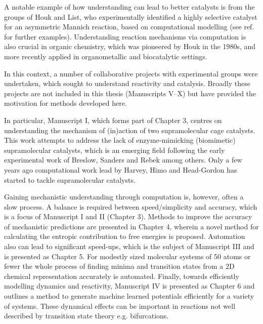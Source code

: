 \documentclass[../main.tex]{subfiles}
\begin{document}
A notable example of how understanding can lead to better catalysts is from the groups of Houk and List, who experimentally identified a highly selective catalyst for an asymmetric Mannich reaction,\cite{Mitsumori2006} based on computational modelling (see ref. \cite{Houk2008} for  further examples).\cite{Cheong2006} Understanding reaction mechanisms via computation is also crucial in organic chemistry, which was pioneered by Houk in the 1980s,\cite{Houk1986} and more recently applied in organometallic\cite{Ardkhean2020} and biocatalytic\cite{PlanasIglesias2021} settings. 

In this context, a number of collaborative projects with experimental groups were undertaken, which sought to understand reactivity and catalysis. Broadly these projects are not included in this thesis (Manuscripts \RN{5}--\RN{10}) but have provided the motivation for methods developed here.

In particular, Manuscript \RN{1}, which forms part of  Chapter 3, centres on understanding the mechanism of (in)action of two supramolecular cage catalysts. This work attempts to address the lack of enzyme-mimicking (biomimetic) supramolecular catalysts, which is an emerging field following the early experimental work of Breslow,\cite{Breslow1998}   Sanders\cite{Sanders1998} and Rebek\cite{Santamaria1999} among others. Only a few years ago computational work lead by Harvey\cite{Daver2017, Daver2018}, Himo\cite{Brea2019} and Head-Gordon\cite{Welborn2020} has started to tackle supramolecular catalysts.

Gaining mechanistic understanding through computation is, however, often a slow process. A balance is required between speed/simplicity and accuracy, which is a focus of Manuscript \RN{1} and \RN{2} (Chapter 3). Methods to improve the accuracy of mechanistic predictions are presented in Chapter 4, wherein a novel method for calculating the entropic contribution to free energies is proposed. Automation also can lead to significant speed-ups, which is the subject of Manuscript \RN{3} and is presented as Chapter 5. For modestly sized molecular systems of 50 atoms or fewer the whole process of finding minima and transition states from a 2D chemical representation accurately is automated. Finally, towards efficiently modelling dynamics and reactivity, Manuscript \RN{4} is presented as Chapter 6 and outlines a method to generate machine learned potentials efficiently for a variety of systems. These dynamical effects can be important in reactions not well described by transition state theory e.g. bifurcations.\cite{Feng2021} 
\end{document}
